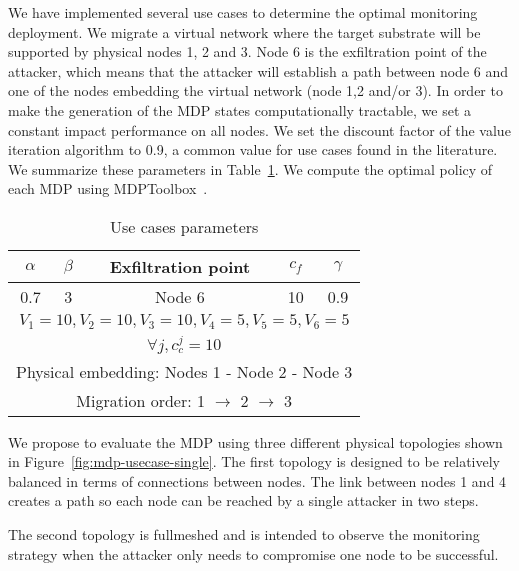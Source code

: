 We have implemented several use cases to determine the optimal monitoring deployment.
We migrate a virtual network where the target substrate will be supported by physical nodes 1, 2 and 3.
Node 6 is the exfiltration point of the attacker, which means that the attacker will establish a path between node 6 and one of the nodes embedding the virtual network (\ie node 1,2 and/or 3).
In order to make the generation of the MDP states computationally tractable, we set a constant impact performance on all nodes. We set the discount factor of the value iteration algorithm to 0.9, a common value for use cases found in the literature.
We summarize these parameters in Table~\ref{tab:mdp-parameters}.
We compute the optimal policy of each MDP using MDPToolbox~\cite{Chades2014}.

\begin{table}[h]
\centering
\begin{tabular}{|c|c|l|c|c|c|}
\hline
$\alpha$ & \multicolumn{2}{c|}{$\beta$} & Exfiltration point & $c_f$ & $\gamma$ \\ \hline
0.7      & \multicolumn{2}{c|}{3}       & Node 6             & 10    & 0.9      \\ \hline
\multicolumn{6}{|c|}{$V_1=10,V_2=10,V_3=10,V_4=5,V_5=5,V_6=5$}                             \\ \hline
\multicolumn{6}{|c|}{$\forall j, c_c^j=10$}                             \\ \hline
\multicolumn{6}{|l|}{Physical embedding: Nodes 1 - Node 2 - Node 3}             \\ \hline
\multicolumn{6}{|c|}{Migration order: 1 $\rightarrow$ 2 $\rightarrow$ 3}                              \\ \hline
\end{tabular}
\caption{Use cases parameters}
\label{tab:mdp-parameters}
\end{table}

We propose to evaluate the MDP using three different physical topologies shown in Figure~\ref{fig:mdp-usecase-single}. The first topology is designed to be relatively balanced in terms of connections between nodes. The link between nodes 1 and 4 creates a path so each node can be reached by a single attacker in two steps.

The second topology is fullmeshed and is intended to observe the monitoring strategy when the attacker only needs to compromise one node to be successful.

